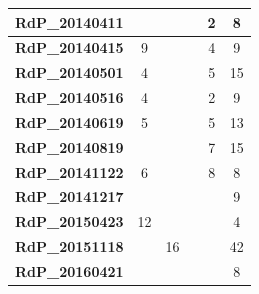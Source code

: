 \begin{table}
\begin{tabular}{|l|c|c|c|c|c|}
    {\color[HTML]{3166FF} \textbf{RdP\_20140411}}     &                          &                          &                          & 2                        & 8                        \\ \hline
    {\color[HTML]{3166FF} \textbf{RdP\_20140415}}     & 9                        &                          &                          & 4                        & 9                        \\ \hline
    {\color[HTML]{3166FF} \textbf{RdP\_20140501}}     & 4                        &                          &                          & 5                        & 15                       \\ \hline
    {\color[HTML]{3166FF} \textbf{RdP\_20140516}}     & 4                        &                          &                          & 2                        & 9                        \\ \hline
    {\color[HTML]{3166FF} \textbf{RdP\_20140619}}     & 5                        &                          &                          & 5                        & 13                       \\ \hline
    {\color[HTML]{3166FF} \textbf{RdP\_20140819}}     &                          &                          &                          & 7                        & 15                       \\ \hline
    {\color[HTML]{3166FF} \textbf{RdP\_20141122}}     & 6                        &                          &                          & 8                        & 8                        \\ \hline
    {\color[HTML]{3166FF} \textbf{RdP\_20141217}}     &                          &                          &                          &                          & 9                        \\ \hline
    {\color[HTML]{3166FF} \textbf{RdP\_20150423}}     & 12                       &                          &                          &                          & 4                        \\ \hline
    {\color[HTML]{3166FF} \textbf{RdP\_20151118}}     &                          & 16                       &                          &                          & 42                       \\ \hline
    {\color[HTML]{3166FF} \textbf{RdP\_20160421}}     &                          &                          &                          &                          & 8                        \\ \hline

\end{tabular}
\end{table}
